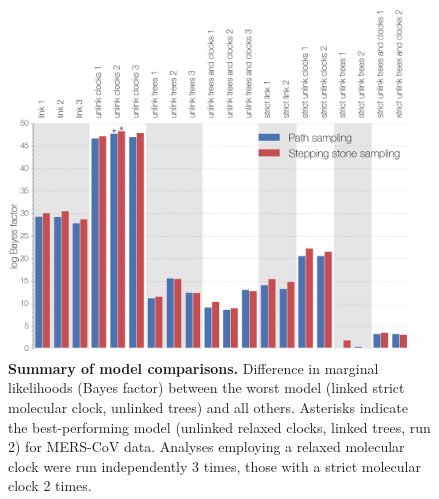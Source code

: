 \documentclass[11pt,oneside,letterpaper]{article}
\begin{document}
\begin{figure}[h!]
	\centering
	\includegraphics[width=0.95\textwidth]{figures/MERS_marginal_likelihoods.png}
	\caption{\textbf{Summary of model comparisons.}
Difference in marginal likelihoods (Bayes factor) between the worst model (linked strict molecular clock, unlinked trees) and all others.
Asterisks indicate the best-performing model (unlinked relaxed clocks, linked trees, run 2) for MERS-CoV data.
Analyses employing a relaxed molecular clock were run independently 3 times, those with a strict molecular clock 2 times.}
	\label{marginal}
\end{figure}
\end{document}

